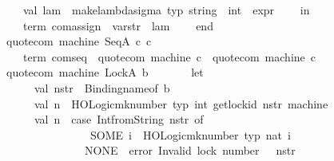 \begin{isabellebody}
\ \ \ \ \ \ val\ lam\ {\isacharequal}{\kern0pt}\ make{\isacharunderscore}{\kern0pt}lambda{\isacharunderscore}{\kern0pt}sigma\ {\isacharat}{\kern0pt}{\isacharbraceleft}{\kern0pt}typ\ {\isachardoublequote}{\kern0pt}string\ {\isasymRightarrow}\ int{\isachardoublequote}{\kern0pt}{\isacharbraceright}{\kern0pt}\ {\isachardoublequote}{\kern0pt}{\isasymsigma}{\isachardoublequote}{\kern0pt}\ expr\isanewline
\ \ \ \ in\isanewline
\ \ \ \ \ \ {\isacharat}{\kern0pt}{\isacharbraceleft}{\kern0pt}term\ com{\isachardot}{\kern0pt}assign{\isacharbraceright}{\kern0pt}\ {\isachardollar}{\kern0pt}\ var{\isacharunderscore}{\kern0pt}str\ {\isachardollar}{\kern0pt}\ lam\isanewline
\ \ \ \ end\isanewline
\ \ \ \ \ \ \ \isanewline
\ \ {\isacharbar}{\kern0pt}\ quote{\isacharunderscore}{\kern0pt}com\ machine\ {\isacharparenleft}{\kern0pt}SeqA\ {\isacharparenleft}{\kern0pt}c{}{\isacharcomma}{\kern0pt}\ c{}{\isacharparenright}{\kern0pt}{\isacharparenright}{\kern0pt}\ {\isacharequal}{\kern0pt}\isanewline
\ \ \ \ \ \ {\isacharat}{\kern0pt}{\isacharbraceleft}{\kern0pt}term\ com{\isachardot}{\kern0pt}seq{\isacharbraceright}{\kern0pt}\ {\isachardollar}{\kern0pt}\ quote{\isacharunderscore}{\kern0pt}com\ machine\ c{}\ {\isachardollar}{\kern0pt}\ quote{\isacharunderscore}{\kern0pt}com\ machine\ c{}\isanewline
\ \ {\isacharbar}{\kern0pt}\ quote{\isacharunderscore}{\kern0pt}com\ machine\ {\isacharparenleft}{\kern0pt}LockA\ b{\isacharparenright}{\kern0pt}\ {\isacharequal}{\kern0pt}\isanewline
\ \ \ \ \ \ let\ \isanewline
\ \ \ \ \ \ \ \ val\ n{\isacharunderscore}{\kern0pt}str\ {\isacharequal}{\kern0pt}\ Binding{\isachardot}{\kern0pt}name{\isacharunderscore}{\kern0pt}of\ b\isanewline
\ \ \ \ \ \ \ \ val\ n\ {\isacharequal}{\kern0pt}\ HOLogic{\isachardot}{\kern0pt}mk{\isacharunderscore}{\kern0pt}number\ {\isacharat}{\kern0pt}{\isacharbraceleft}{\kern0pt}typ\ int{\isacharbraceright}{\kern0pt}\ {\isacharparenleft}{\kern0pt}get{\isacharunderscore}{\kern0pt}lock{\isacharunderscore}{\kern0pt}id\ n{\isacharunderscore}{\kern0pt}str\ machine{\isacharparenright}{\kern0pt}\isanewline
\ \ \ \ \ \ \ \ {\isacharparenleft}{\kern0pt}{\isacharasterisk}{\kern0pt}val\ n\ {\isacharequal}{\kern0pt}\ case\ Int{\isachardot}{\kern0pt}fromString\ n{\isacharunderscore}{\kern0pt}str\ of\isanewline
\ \ \ \ \ \ \ \ \ \ \ \ \ \ \ \ \ \ SOME\ i\ {\isacharequal}{\kern0pt}{\isachargreater}{\kern0pt}\ HOLogic{\isachardot}{\kern0pt}mk{\isacharunderscore}{\kern0pt}number\ {\isacharat}{\kern0pt}{\isacharbraceleft}{\kern0pt}typ\ nat{\isacharbraceright}{\kern0pt}\ i\isanewline
\ \ \ \ \ \ \ \ \ \ \ \ \ \ \ \ {\isacharbar}{\kern0pt}\ NONE\ {\isacharequal}{\kern0pt}{\isachargreater}{\kern0pt}\ error\ {\isacharparenleft}{\kern0pt}{\isachardoublequote}{\kern0pt}Invalid\ lock\ number{\isacharcolon}{\kern0pt}\ {\isachardoublequote}{\kern0pt}\ {\isacharcircum}{\kern0pt}\ n{\isacharunderscore}{\kern0pt}str{\isacharparenright}{\kern0pt}{\isacharasterisk}{\kern0pt}{\isacharparenright}{\kern0pt}\isanewline

\end{isabellebody}
